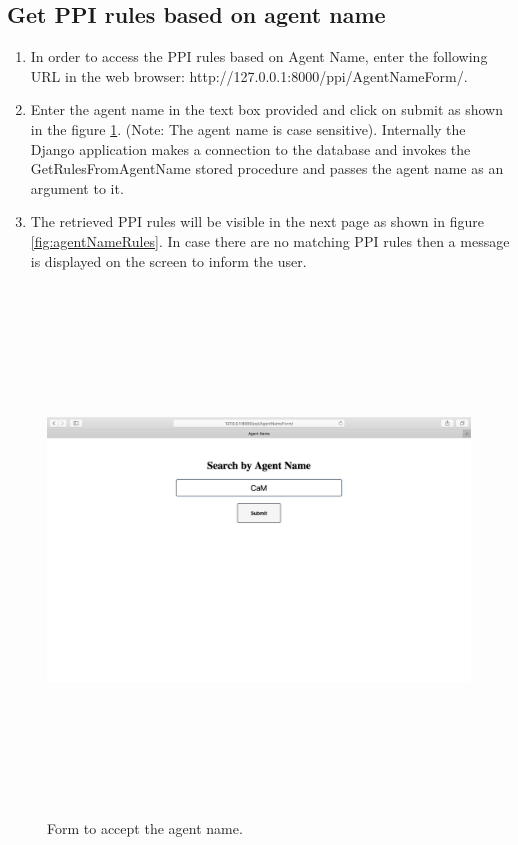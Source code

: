 \documentclass[msc,deptreport,ai]{infthesis}      %
\begin{document}
\subsection {Get PPI rules based on agent name}
\begin{enumerate}
	\item In order to access the PPI rules based on Agent Name, enter the following URL in the web browser: http://127.0.0.1:8000/ppi/AgentNameForm/.
	\item Enter the agent name in the text box provided and click on submit as shown in the figure \ref{fig:agentNameForm}. (Note: The agent name is case sensitive). Internally the Django application makes a connection to the database and invokes the GetRulesFromAgentName stored procedure and passes the agent name as an argument to it.
	\item The retrieved PPI rules will be visible in the next page as shown in figure \ref{fig:agentNameRules}. In case there are no matching PPI rules then a message is displayed on the screen to inform the user.
\end{enumerate}
  \begin{figure}[H]
	\centering
	\captionsetup{justification=centering}
	\includegraphics[width=\linewidth,height=14cm,keepaspectratio]{AgentNameForm.png}	
	\caption{Form to accept the agent name.}
	\label{fig:agentNameForm}		
\end{figure}
\end{document}
